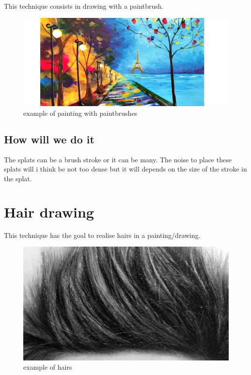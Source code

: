 \documentclass[12pt]{article}
\begin{document}
This technique consists in drawing with a paintbrush.

\begin{figure}[!ht]
    \begin{center}
        \includegraphics[scale=0.6]{image/paintbrush.png}
        \caption{example of painting with paintbrushes}
    \end{center}
\end{figure}

\subsection{How will we do it}

The splats can be a brush stroke or it can be many. The noise to place these splats will i think be not too dense but it will depends on the size of the stroke in the splat.

\section{Hair drawing}

This technique has the goal to realise hairs in a painting/drawing.

\begin{figure}[!ht]
    \begin{center}
        \includegraphics[scale=0.3]{image/hairs.jpg}
        \caption{example of hairs}
    \end{center}
\end{figure}
\end{document}
